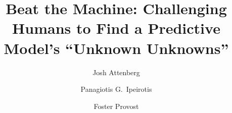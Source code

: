 \documentclass[smallcondensed]{svjour3}
\begin{document}
 
\title{Beat the Machine: Challenging Humans to Find a Predictive Model's ``Unknown Unknowns''}


\author{Josh Attenberg         \and
        Panagiotis G.\ Ipeirotis \and Foster Provost %
}


%
%
%





\maketitle
\end{document}
